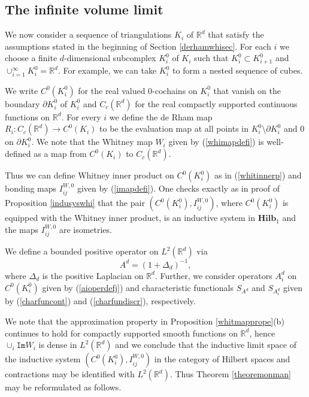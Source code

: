 \documentclass[11pt,reqno]{amsart}
\numberwithin{equation}{section}
\theoremstyle{remark}
\theoremstyle{rmdefinition}
\begin{document}
\subsection{The infinite volume limit}

We now consider a sequence of triangulations ${K_i}$ of $\mathbb{R}^d$ that satisfy the assumptions stated in the beginning of Section \ref{derhamwhisec}. For each $i$ we choose a finite $d$-dimensional subcomplex $K_i^0$ of $K_i$ such that $K_i^0\subset K_{i+1}^0$ and 
$\cup_{i=1}^{\infty}K_i^0=\mathbb{R}^d$. For example, we can take $K_i^0$ to form a nested sequence of cubes.

We write $C^0(K_i^0)$ for the real valued $0$-cochains on $K_i^0$ that vanish on the boundary $\partial K_i^0$ of $K_i^0$ and $C_c(\mathbb{R}^d)$ for the real compactly supported continuous functions on $\mathbb{R}^d$. For every $i$ we define the de Rham map $R_i: C_c(\mathbb{R}^d) \rightarrow C^0(K_{i})$ to be the evaluation map at all points in $K_i^0 \setminus \partial K_i^0$ and 0 on $\partial K_i^0$. We note that the Whitney map $W_i$ given by (\ref{whimapdefi}) is well-defined as a map from $C^0(K_{i})$ to $C_c(\mathbb{R}^d)$. 

Thus we can define Whitney inner product on $C^0(K_i^0)$ as in (\ref{whitinnerp}) and bonding maps $I_{ij}^{W,0}$ given by (\ref{imapdefi}).
One checks exactly as in proof of Proposition \ref{indusyswhi} that the pair $( C^0(K_{i}^0), I_{ij}^{W,0})$, where $C^0(K_{i}^0)$ is equipped with the Whitney inner product, is an inductive system in $\mathbf{Hilb}_1$  and the maps $I_{ij}^{W,0}$ are isometries. 

We define a bounded positive operator on $L^2(\mathbb{R}^d)$ via
$$ A^d=(1+\Delta_d)^{-1},$$
where $\Delta_d$ is the positive Laplacian on $\mathbb{R}^d$. Further, we  consider operators $A^d_i$ on $C^0(K_{i}^0)$ given by (\ref{aioperdefj}) and characteristic functionals $S_{ A^d}$ and $S_{A^d_i}$ given by (\ref{charfuncont}) and (\ref{charfundiscr}), respectively.

We note that the approximation property in Proposition \ref{whitmapprope}(b) continues to hold for compactly supported smooth functions on $\mathbb{R}^d$, hence $\cup_{i}\mathtt{Im}W_i$ is dense in $L^2(\mathbb{R}^d)$ and we conclude that the inductive limit space of the inductive system $( C^0(K_{i}^0), I_{ij}^{W,0})$ in the category of Hilbert spaces and contractions may be identified with $L^2(\mathbb{R}^d)$. Thus Theorem \ref{theoremonman} may be reformulated as follows.
\end{document}
